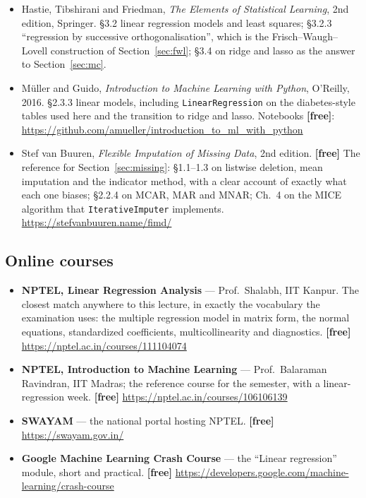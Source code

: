 \documentclass[11pt]{article}
\begin{document}
\begin{itemize}[leftmargin=*]
    \textbf{standardized regression coefficients}; Ch.~4 model adequacy
    checking, including \textbf{partial regression (added-variable) plots};
    Ch.~9 multicollinearity, including the derivation of the variance
    inflation factor.
  \item Hastie, Tibshirani and Friedman, \emph{The Elements of Statistical
    Learning}, 2nd edition, Springer. \S3.2 linear regression models and
    least squares; \S3.2.3 ``regression by successive orthogonalisation'',
    which is the Frisch--Waugh--Lovell construction of
    Section~\ref{sec:fwl}; \S3.4 on ridge and lasso as the answer to
    Section~\ref{sec:mc}.
  \item M\"uller and Guido, \emph{Introduction to Machine Learning with
    Python}, O'Reilly, 2016. \S2.3.3 linear models, including
    \texttt{LinearRegression} on the diabetes-style tables used here and the
    transition to ridge and lasso. Notebooks \textbf{[free]}:
    \url{https://github.com/amueller/introduction_to_ml_with_python}
  \item Stef van Buuren, \emph{Flexible Imputation of Missing Data}, 2nd
    edition. \textbf{[free]} The reference for Section~\ref{sec:missing}:
    \S1.1--1.3 on listwise deletion, mean imputation and the indicator
    method, with a clear account of exactly what each one biases; \S2.2.4 on
    MCAR, MAR and MNAR; Ch.~4 on the MICE algorithm that
    \texttt{IterativeImputer} implements.
    \url{https://stefvanbuuren.name/fimd/}
\end{itemize}

\subsection*{Online courses}

\begin{sloppypar}
\begin{itemize}[leftmargin=*]
  \item \textbf{NPTEL, Linear Regression Analysis} --- Prof.\ Shalabh, IIT
    Kanpur. The closest match anywhere to this lecture, in exactly the
    vocabulary the examination uses: the multiple regression model in matrix
    form, the normal equations, standardized coefficients, multicollinearity
    and diagnostics. \textbf{[free]}
    \url{https://nptel.ac.in/courses/111104074}
  \item \textbf{NPTEL, Introduction to Machine Learning} --- Prof.\ Balaraman
    Ravindran, IIT Madras; the reference course for the semester, with a
    linear-regression week. \textbf{[free]}
    \url{https://nptel.ac.in/courses/106106139}
  \item \textbf{SWAYAM} --- the national portal hosting NPTEL. \textbf{[free]}
    \url{https://swayam.gov.in/}
  \item \textbf{Google Machine Learning Crash Course} --- the ``Linear
    regression'' module, short and practical. \textbf{[free]}
    \url{https://developers.google.com/machine-learning/crash-course}
\end{itemize}
\end{sloppypar}
\end{document}
